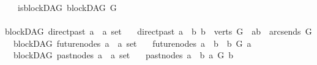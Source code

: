\begin{isabellebody}
\ \ \ is{\isacharunderscore}{\kern0pt}blockDAG{\isacharcolon}{\kern0pt}\ {\isachardoublequoteopen}blockDAG\ G{\isachardoublequoteclose}%
\isadelimdocument
%
\endisadelimdocument
%
\isatagdocument
%
\isamarkuptrue%
%
\endisatagdocument
{\isafolddocument}%
%
\isadelimdocument
%
\endisadelimdocument
{}\isamarkupfalse%
\ {\isacharparenleft}{\kern0pt}\ \ \ \ \ \ \ \ \ \ \ \ \ \ \ \ \ \ \ \ \ \ \ \ \ \ \ \ \ \ \ \ \ \ \ \ \ \ \ \ \ \ \ \ \ \ \ \ \ \isanewline
blockDAG{\isacharparenright}{\kern0pt}\ direct{\isacharunderscore}{\kern0pt}past{\isacharcolon}{\kern0pt}{\isacharcolon}{\kern0pt}\ {\isachardoublequoteopen}{\isacharprime}{\kern0pt}a\ {\isasymRightarrow}\ {\isacharprime}{\kern0pt}a\ set{\isachardoublequoteclose}\isanewline
\ \ \ {\isachardoublequoteopen}direct{\isacharunderscore}{\kern0pt}past\ a\ {\isacharequal}{\kern0pt}\ {\isacharbraceleft}{\kern0pt}b{\isachardot}{\kern0pt}\ {\isacharparenleft}{\kern0pt}b\ {\isasymin}\ verts\ G\ {\isasymand}\ {\isacharparenleft}{\kern0pt}a{\isacharcomma}{\kern0pt}b{\isacharparenright}{\kern0pt}\ {\isasymin}\ arcs{\isacharunderscore}{\kern0pt}ends\ G{\isacharparenright}{\kern0pt}{\isacharbraceright}{\kern0pt}{\isachardoublequoteclose}\isanewline
\isanewline
{}\isamarkupfalse%
\ {\isacharparenleft}{\kern0pt}\ blockDAG{\isacharparenright}{\kern0pt}\ future{\isacharunderscore}{\kern0pt}nodes{\isacharcolon}{\kern0pt}{\isacharcolon}{\kern0pt}\ {\isachardoublequoteopen}{\isacharprime}{\kern0pt}a\ {\isasymRightarrow}\ {\isacharprime}{\kern0pt}a\ set{\isachardoublequoteclose}\isanewline
\ \ \ {\isachardoublequoteopen}future{\isacharunderscore}{\kern0pt}nodes\ a\ {\isacharequal}{\kern0pt}\ {\isacharbraceleft}{\kern0pt}b{\isachardot}{\kern0pt}\ \ b\ {\isasymrightarrow}\isactrlsup {\isacharplus}{\kern0pt}\isactrlbsub G\isactrlesub \ a{\isacharbraceright}{\kern0pt}{\isachardoublequoteclose}\isanewline
\isanewline
{}\isamarkupfalse%
\ {\isacharparenleft}{\kern0pt}\ blockDAG{\isacharparenright}{\kern0pt}\ past{\isacharunderscore}{\kern0pt}nodes{\isacharcolon}{\kern0pt}{\isacharcolon}{\kern0pt}\ {\isachardoublequoteopen}{\isacharprime}{\kern0pt}a\ {\isasymRightarrow}\ {\isacharprime}{\kern0pt}a\ set{\isachardoublequoteclose}\isanewline
\ \ \ {\isachardoublequoteopen}past{\isacharunderscore}{\kern0pt}nodes\ a\ {\isacharequal}{\kern0pt}\ {\isacharbraceleft}{\kern0pt}b{\isachardot}{\kern0pt}\ a\ {\isasymrightarrow}\isactrlsup {\isacharplus}{\kern0pt}\isactrlbsub G\isactrlesub \ b{\isacharbraceright}{\kern0pt}{\isachardoublequoteclose}\isanewline

\end{isabellebody}
